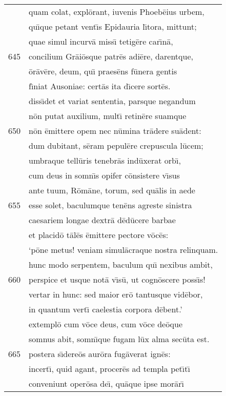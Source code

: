 \documentclass[paper=6in:9in,pagesize=pdftex,
               headinclude=on,footinclude=on,12pt]{scrbook}
\begin{document}
\begin{longtable}[p]{ r l }
 & quam colat, expl\=orant, iuvenis Phoeb\=eius urbem,\\ 
 & qu\={\i}que petant vent\={\i}s Epidauria l\={\i}tora, mittunt;\\ 
 & quae simul incurv\=a miss\={\i} tetig\=ere car\={\i}n\=a,\\ 
645 & concilium Gr\=ai\=osque patr\=es adi\=ere, darentque,\\ 
 & \=or\=av\=ere, deum, qu\={\i} praes\=ens f\=unera gentis\\ 
 & f\={\i}niat Ausoniae: cert\=as ita d\={\i}cere sort\=es.\\ 
 & diss\={\i}det et variat sententia, parsque negandum\\ 
 & n\=on putat auxilium, mult\={\i} retin\=ere suamque\\ 
650 & n\=on \=emittere opem nec n\=umina tr\=adere su\=adent:\\ 
 & dum dubitant, s\=eram pepul\=ere crepuscula l\=ucem;\\ 
 & umbraque tell\=uris tenebr\=as ind\=uxerat orb\={\i},\\ 
 & cum deus in somn\={\i}s opifer c\=onsistere v\={\i}sus\\ 
 & ante tuum, R\=om\=ane, torum, sed qu\=alis in aede\\ 
655 & esse solet, baculumque ten\=ens agreste sinistra\\ 
 & caesariem longae dextr\=a d\=ed\=ucere barbae\\ 
 & et placid\=o t\=al\=es \=emittere pectore v\=oc\=es:\\ 
 & `p\=one metus! veniam simul\=acraque nostra relinquam.\\ 
 & hunc modo serpentem, baculum qu\={\i} nexibus ambit,\\ 
660 & perspice et usque not\=a v\={\i}s\=u, ut cogn\=oscere poss\={\i}s!\\ 
 & vertar in hunc: sed maior er\=o tantusque vid\=ebor,\\ 
 & in quantum vert\={\i} caelestia corpora d\=ebent.'\\ 
 & extempl\=o cum v\=oce deus, cum v\=oce de\=oque\\ 
 & somnus abit, somn\={\i}que fugam l\=ux alma sec\=uta est.\\ 
665 & postera s\={\i}dere\=os aur\=ora fug\=averat ign\=es:\\ 
 & incert\={\i}, quid agant, procer\=es ad templa pet\={\i}t\={\i}\\ 
 & conveniunt oper\=osa de\={\i}, qu\=aque ipse mor\=ar\={\i}\\ 

\end{longtable}
\end{document}
